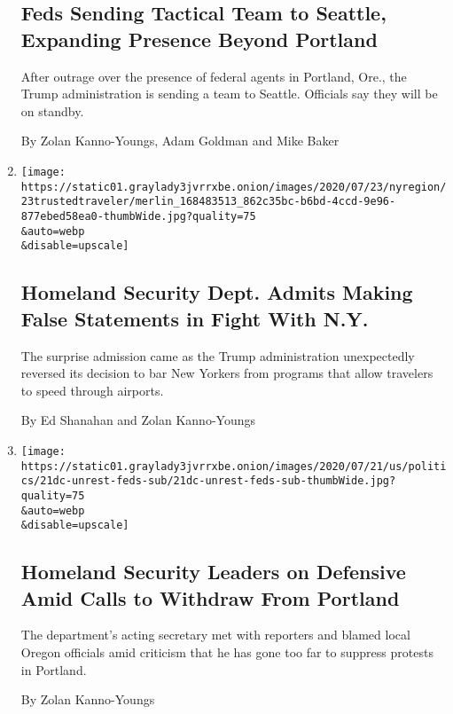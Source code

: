\begin{enumerate}
  \hypertarget{feds-sending-tactical-team-to-seattle-expanding-presence-beyond-portland}{%
  \subsection{Feds Sending Tactical Team to Seattle, Expanding Presence
  Beyond
  Portland}\label{feds-sending-tactical-team-to-seattle-expanding-presence-beyond-portland}}

  After outrage over the presence of federal agents in Portland, Ore.,
  the Trump administration is sending a team to Seattle. Officials say
  they will be on standby.

  By Zolan Kanno-Youngs, Adam Goldman and Mike Baker
\item
  \href{/2020/07/23/nyregion/trusted-traveler-homeland-security.html}{}

  \texttt{[image: https://static01.graylady3jvrrxbe.onion/images/2020/07/23/nyregion/23trustedtraveler/merlin\_168483513\_862c35bc-b6bd-4ccd-9e96-877ebed58ea0-thumbWide.jpg?quality=75\\\&auto=webp\\\&disable=upscale]}

  \hypertarget{homeland-security-dept-admits-making-false-statements-in-fight-with-ny}{%
  \subsection{Homeland Security Dept. Admits Making False Statements in
  Fight With
  N.Y.}\label{homeland-security-dept-admits-making-false-statements-in-fight-with-ny}}

  The surprise admission came as the Trump administration unexpectedly
  reversed its decision to bar New Yorkers from programs that allow
  travelers to speed through airports.

  By Ed Shanahan and Zolan Kanno-Youngs
\item
  \href{/2020/07/21/us/politics/homeland-security-portland-oregon.html}{}

  \texttt{[image: https://static01.graylady3jvrrxbe.onion/images/2020/07/21/us/politics/21dc-unrest-feds-sub/21dc-unrest-feds-sub-thumbWide.jpg?quality=75\\\&auto=webp\\\&disable=upscale]}

  \hypertarget{homeland-security-leaders-on-defensive-amid-calls-to-withdraw-from-portland}{%
  \subsection{Homeland Security Leaders on Defensive Amid Calls to
  Withdraw From
  Portland}\label{homeland-security-leaders-on-defensive-amid-calls-to-withdraw-from-portland}}

  The department's acting secretary met with reporters and blamed local
  Oregon officials amid criticism that he has gone too far to suppress
  protests in Portland.

  By Zolan Kanno-Youngs
\end{enumerate}


